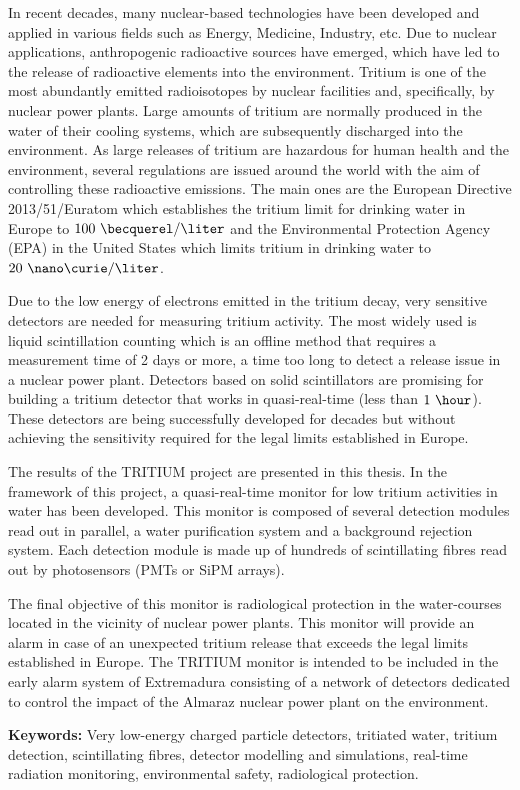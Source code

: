 In recent decades, many nuclear-based technologies have been developed and applied in various fields such as Energy, Medicine, Industry, etc. Due to nuclear applications, anthropogenic radioactive sources have emerged, which have led to the release of radioactive elements into the environment. Tritium is one of the most abundantly emitted radioisotopes by nuclear facilities and, specifically, by nuclear power plants. Large amounts of tritium are normally produced in the water of their cooling systems, which are subsequently discharged into the environment. As large releases of tritium are hazardous for human health and the environment, several regulations are issued around the world with the aim of controlling these radioactive emissions. The main ones are the European Directive 2013/51/Euratom which establishes the tritium limit for drinking water in Europe to $100~\becquerel/\liter$ and the Environmental Protection Agency (EPA) in the United States which limits tritium in drinking water to $20~\nano\curie/\liter$.

Due to the low energy of electrons emitted in the tritium decay, very sensitive detectors are needed for measuring tritium activity. The most widely used is liquid scintillation counting which is an offline method that requires a measurement time of 2 days or more, a time too long to detect a release issue in a nuclear power plant. Detectors based on solid scintillators are promising for building a tritium detector that works in quasi-real-time (less than $1~\hour$). These detectors are being successfully developed for decades but without achieving the sensitivity required for the legal limits established in Europe.

The results of the TRITIUM project are presented in this thesis. In the framework of this project, a quasi-real-time monitor for low tritium activities in water has been developed. This monitor is composed of several detection modules read out in parallel, a water purification system and a background rejection system. Each detection module is made up of hundreds of scintillating fibres read out by photosensors (PMTs or SiPM arrays).

The final objective of this monitor is radiological protection in the water-courses located in the vicinity of nuclear power plants. This monitor will provide an alarm in case of an unexpected tritium release that exceeds the legal limits established in Europe. The TRITIUM monitor is intended to be included in the early alarm system of Extremadura consisting of a network of detectors dedicated to control the impact of the Almaraz nuclear power plant on the environment.

\vspace{1cm}

\textbf{Keywords:} Very low-energy charged particle detectors, tritiated water, tritium detection, scintillating fibres, detector modelling and simulations, real-time radiation monitoring, environmental safety, radiological protection.